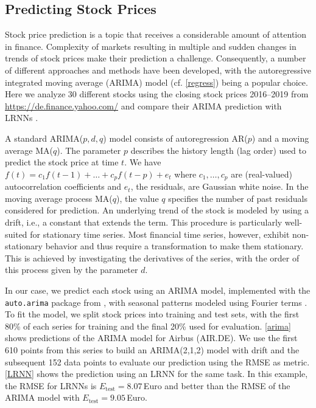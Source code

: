 \documentclass[twoside,11pt]{article}
\theoremstyle{definition}
\newcommand{\euro}{Euro}
\begin{document}
\subsection{Predicting Stock Prices}\label{stock}

Stock price prediction is a topic that receives a considerable amount of
attention in finance. Complexity of markets resulting in multiple and sudden
changes in trends of stock prices make their prediction a challenge.
Consequently, a number of different approaches and methods have been developed,
with the autoregressive integrated moving average (ARIMA) model (cf.
\cref{regress}) being a popular choice. Here we analyze 30
different stocks using the closing stock prices 2016--2019 from
\url{https://de.finance.yahoo.com/} and compare their ARIMA prediction with
LRNNs \citep[cf.][]{Lit20}.

A standard ARIMA($p,d,q$) model consists of autoregression AR($p$) and a moving
average MA($q$). The parameter $p$ describes the history length (lag order) used to predict the stock
price at time $t$. We have $f(t) = c_1 f(t-1) + \dots + c_p f(t-p) +
e_t$ where $c_1,\dots,c_p$
are (real-valued) autocorrelation coefficients and $e_t$, the residuals, are Gaussian
white noise. In the moving average process MA($q$), the value $q$
specifies the number of past residuals considered for prediction. An underlying trend of
the stock is modeled by using a drift, i.e., a constant that extends the term.
This procedure is particularly well-suited for stationary time series. Most
financial time series, however, exhibit non-stationary behavior and thus
require a transformation to make them stationary. This is achieved by
investigating the derivatives of the series, with the order of this process
given by the parameter $d$.

In our case, we predict each stock using an ARIMA model, implemented with the
\texttt{auto.arima} package from \citet{HK08}, with seasonal patterns modeled
using Fourier terms \citep[p.\,321]{HA13}. To fit the model, we split stock
prices into training and test sets, with the first 80\% of each series
for training and the final 20\% used for evaluation. \cref{arima} shows predictions
of the ARIMA model for Airbus (AIR.DE). We use the first 610 points from this series
to build an ARIMA(2,1,2) model with drift and the subsequent 152 data points
to evaluate our prediction using the RMSE as metric. \cref{LRNN} shows the
prediction using an LRNN for the same task.
In this example, the RMSE for LRNNs is $E_\mathrm{test}=8.07${\,\euro} and better
than the RMSE of the ARIMA model with $E_\mathrm{test}=9.05${\,\euro}.
\end{document}
